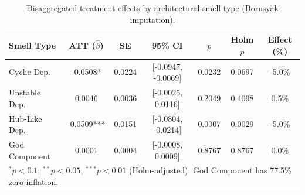 \begin{table}[t]
\centering
\caption{Disaggregated treatment effects by architectural smell type (Borusyak imputation).}
\label{tab:disaggregated}
\begin{tabular}{lcccccc}
\toprule
Smell Type & ATT ($\hat{\beta}$) & SE & 95\% CI & $p$ & Holm $p$ & Effect (\%) \\
\midrule
Cyclic Dep. & -0.0508* & 0.0224 & [-0.0947, -0.0069] & 0.0232 & 0.0697 & -5.0\% \\
Unstable Dep. & 0.0046 & 0.0036 & [-0.0025, 0.0116] & 0.2049 & 0.4098 & 0.5\% \\
Hub-Like Dep. & -0.0509*** & 0.0151 & [-0.0804, -0.0214] & 0.0007 & 0.0029 & -5.0\% \\
God Component & 0.0001 & 0.0004 & [-0.0008, 0.0009] & 0.8767 & 0.8767 & 0.0\% \\
\bottomrule
\multicolumn{7}{l}{\footnotesize $^{*}p<0.1$; $^{**}p<0.05$; $^{***}p<0.01$ (Holm-adjusted). God Component has 77.5\% zero-inflation.} \\
\end{tabular}
\end{table}
